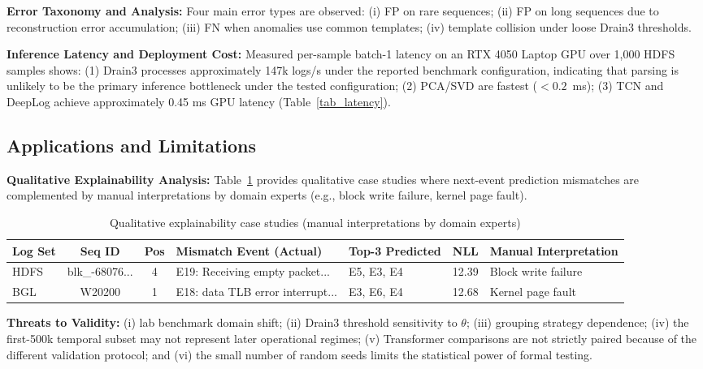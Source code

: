 \documentclass[conference]{IEEEtran}
\begin{document}
\textbf{Error Taxonomy and Analysis:} Four main error types are observed: (i) FP on rare sequences; (ii) FP on long sequences due to reconstruction error accumulation; (iii) FN when anomalies use common templates; (iv) template collision under loose Drain3 thresholds.

\textbf{Inference Latency and Deployment Cost:} Measured per-sample batch-1 latency on an RTX 4050 Laptop GPU over 1,000 HDFS samples shows: (1) Drain3 processes approximately 147k logs/s under the reported benchmark configuration, indicating that parsing is unlikely to be the primary inference bottleneck under the tested configuration; (2) PCA/SVD are fastest ($<0.2$~ms); (3) TCN and DeepLog achieve approximately 0.45 ms GPU latency (Table~\ref{tab_latency}).

\subsection{Applications and Limitations}
\textbf{Qualitative Explainability Analysis:} Table~\ref{tab_explainability} provides qualitative case studies where next-event prediction mismatches are complemented by manual interpretations by domain experts (e.g., block write failure, kernel page fault).

\begin{table}[!t]
\caption{Qualitative explainability case studies (manual interpretations by domain experts)}
\begin{center}
\scriptsize
\setlength{\tabcolsep}{2pt}
\begin{tabular}{lccp{2.2cm}p{1.0cm}cp{1.2cm}}
\toprule
\textbf{Log Set} & \textbf{Seq ID} & \textbf{Pos} & \textbf{Mismatch Event (Actual)} & \textbf{Top-3 Predicted} & \textbf{NLL} & \textbf{Manual Interpretation} \\
\midrule
HDFS & blk\_-68076... & 4 & E19: Receiving empty packet... & E5, E3, E4 & 12.39 & Block write failure \\
BGL & W20200 & 1 & E18: data TLB error interrupt... & E3, E6, E4 & 12.68 & Kernel page fault \\
\bottomrule
\end{tabular}
\label{tab_explainability}
\end{center}
\end{table}

\textbf{Threats to Validity:} (i) lab benchmark domain shift; (ii) Drain3 threshold sensitivity to $\theta$; (iii) grouping strategy dependence; (iv) the first-500k temporal subset may not represent later operational regimes; (v) Transformer comparisons are not strictly paired because of the different validation protocol; and (vi) the small number of random seeds limits the statistical power of formal testing.
\end{document}
